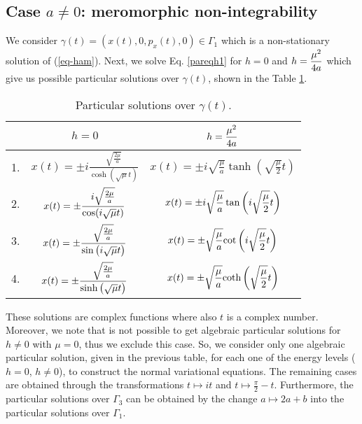 \documentclass[final]{siamart0516}
\begin{document}
\subsection{Case $a\neq 0$: meromorphic non-integrability}
 We consider $\gamma (t)= (x(t), 0, p_x(t), 0)\in\Gamma_1$  which is a non-stationary solution of
(\ref{eq-ham}). Next, we solve Eq. \eqref{pareqh1} for $h=0$ and $\displaystyle{h={\mu^2\over 4a}}$ which give us 
possible particular solutions over $\gamma (t)$, shown in the Table \ref{tabla2}. 
\medskip

\begin{table}[ht]
\begin{center} 
\begin{tabular}{|c|c|c|} 
\hline
     & $h=0$ & $\displaystyle{h={\mu^2\over 4a}}$ \\ \hline
    1. & $\displaystyle{x(t)=\pm i\frac{\sqrt{\frac{2\mu}{a}}}{\cosh(\sqrt{\mu}t) } }$ 
    & $x(t)=\pm\displaystyle{i\sqrt{\frac{\mu}{a}}\tanh\left(\sqrt{\frac{\mu}{2}}t\right)}$ \\ \hline
    2. & $\displaystyle{x(t)=\pm{i\sqrt{2\mu\over a}\over\cos(i\sqrt{\mu}t)}}$ 
& $x(t)=\pm\displaystyle{i\sqrt{\mu\over a}\tan\left(i\sqrt{\mu\over 2}t\right)}$ \\ \hline
    3. & $\displaystyle{x(t)=\pm{\sqrt{2\mu\over a}\over
\sin\left(i\sqrt{\mu}t\right)} }$ & $x(t)=\pm\displaystyle{\sqrt{\mu\over a}\textrm{cot}\left(i\sqrt{\mu\over 2}t\right)}$ \\ \hline
  4. & $\displaystyle{ x(t)=\pm{\sqrt{2\mu\over a}\over
\sinh\left(\sqrt{\mu}t\right)}}$
 & $x(t)=\displaystyle{\pm\sqrt{\mu\over a}\textrm{coth}\left(\sqrt{\mu\over 2}t\right)}$ \\ \hline
\end{tabular} 
\end{center}
\caption{Particular solutions over $\gamma (t)$.}\label{tabla2}
\end{table}


These solutions are complex functions where also $t$ is a complex number. 
Moreover, we note that is not possible to get algebraic particular solutions for $h\neq 0$ with $\mu=0$, thus we exclude this case. So, we consider only one algebraic particular solution, given in the previous table, for each one of the energy levels ($h=0$, $h\neq 0$), to construct the normal variational equations. The remaining cases are obtained
through the transformations $t\mapsto it$ and $t\mapsto \frac{\pi}{2}-t$. Furthermore, the particular solutions over $\Gamma_3$ can be obtained by the change $a\mapsto 2a+b$ into the particular solutions over $\Gamma_1$.
\end{document}
